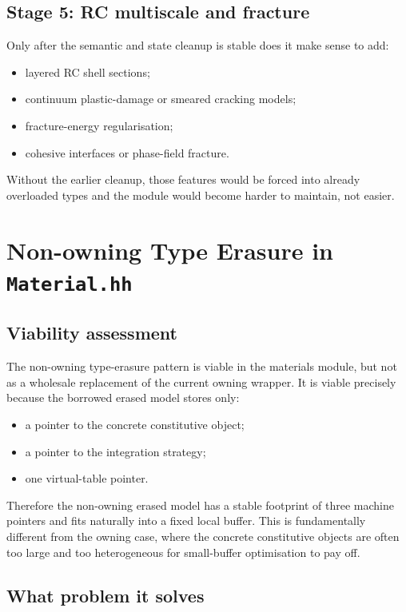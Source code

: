 \subsection{Stage 5: RC multiscale and fracture}

Only after the semantic and state cleanup is stable does it make sense to add:
\begin{itemize}
  \item layered RC shell sections;
  \item continuum plastic-damage or smeared cracking models;
  \item fracture-energy regularisation;
  \item cohesive interfaces or phase-field fracture.
\end{itemize}

Without the earlier cleanup, those features would be forced into already
overloaded types and the module would become harder to maintain, not easier.

\section{Non-owning Type Erasure in \texttt{Material.hh}}

\subsection{Viability assessment}

The non-owning type-erasure pattern is viable in the materials module, but not
as a wholesale replacement of the current owning wrapper.  It is viable
precisely because the borrowed erased model stores only:
\begin{itemize}
  \item a pointer to the concrete constitutive object;
  \item a pointer to the integration strategy;
  \item one virtual-table pointer.
\end{itemize}

Therefore the non-owning erased model has a stable footprint of three machine
pointers and fits naturally into a fixed local buffer.  This is fundamentally
different from the owning case, where the concrete constitutive objects are
often too large and too heterogeneous for small-buffer optimisation to pay
off.

\subsection{What problem it solves}


